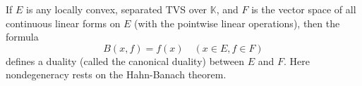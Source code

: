 If $E$ is any locally convex, separated TVS over $\mathbb{K}$, and $F$ is the vector space of all continuous linear forms on $E$ (with the pointwise linear operations), then the formula
$$B(x, f) = f(x) \quad (x \in E, f \in F)$$
defines a duality (called the canonical duality) between $E$ and $F$. Here nondegeneracy rests on the Hahn-Banach theorem.
